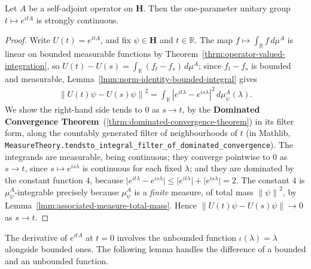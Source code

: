 \begin{lemma}
    \label{lmm:exp-strongly-continuous}
    \leanok
    Let $A$ be a self-adjoint operator on $\mathbf{H}$. Then the one-parameter unitary group $t \mapsto e^{itA}$ is strongly continuous.
\end{lemma}
\begin{proof}
    \leanok
Write $U(t) = e^{itA}$, and fix $\psi \in \mathbf{H}$ and $t \in \mathbb{R}$. The map $f \mapsto \int_{\mathbb{R}} f \, d\mu^A$ is linear on bounded measurable functions by Theorem~\ref{thrm:operator-valued-integration}, so $U(t) - U(s) = \int_{\mathbb{R}} (f_t - f_s) \, d\mu^A$; since $f_t - f_s$ is bounded and measurable, Lemma~\ref{lmm:norm-identity-bounded-integral} gives
\begin{align}
    \left\| U(t)\psi - U(s)\psi \right\|^2 = \int_{\mathbb{R}} \left\lvert e^{it\lambda} - e^{is\lambda} \right\rvert^2 \, d\mu^A_\psi(\lambda).
\end{align}
We show the right-hand side tends to $0$ as $s \to t$, by the \textbf{Dominated Convergence Theorem}~(\ref{thrm:dominated-convergence-theorem}) in its filter form, along the countably generated filter of neighbourhoods of $t$ (in Mathlib, \texttt{MeasureTheory.tendsto\_integral\_filter\_of\_dominated\_convergence}). The integrands are measurable, being continuous; they converge pointwise to $0$ as $s \to t$, since $s \mapsto e^{is\lambda}$ is continuous for each fixed $\lambda$; and they are dominated by the constant function $4$, because $\lvert e^{it\lambda} - e^{is\lambda} \rvert \le \lvert e^{it\lambda} \rvert + \lvert e^{is\lambda} \rvert = 2$. The constant $4$ is $\mu^A_\psi$-integrable precisely because $\mu^A_\psi$ is a \textit{finite} measure, of total mass $\left\| \psi \right\|^2$, by Lemma~\ref{lmm:associated-measure-total-mass}. Hence $\left\| U(t)\psi - U(s)\psi \right\| \to 0$ as $s \to t$.
\end{proof}

The derivative of $e^{itA}$ at $t = 0$ involves the unbounded function $\iota(\lambda) = \lambda$ alongside bounded ones. The following lemma handles the difference of a bounded and an unbounded function.


